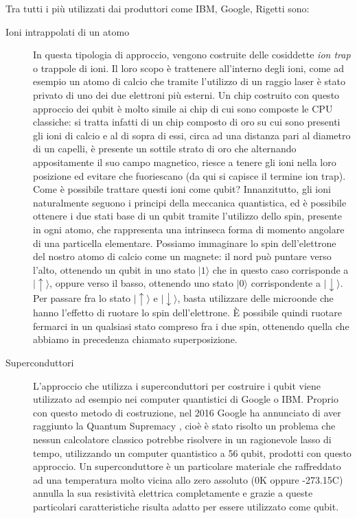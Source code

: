 Tra tutti i più utilizzati dai produttori come IBM, Google, Rigetti sono:

\begin{description}
  \item[Ioni intrappolati di un atomo] In questa tipologia di approccio, vengono costruite delle cosiddette \textit{ion trap} o trappole di ioni. Il loro scopo è trattenere all'interno degli ioni, come ad esempio un atomo di calcio che tramite l'utilizzo di un raggio laser è stato privato di uno dei due elettroni più esterni. Un chip costruito con questo approccio dei qubit è molto simile ai chip di cui sono composte le CPU classiche: si tratta infatti di un chip composto di oro su cui sono presenti gli ioni di calcio e al di sopra di essi, circa ad una distanza pari al diametro di un capelli, è presente un sottile strato di oro che alternando appositamente il suo campo magnetico, riesce a tenere gli ioni nella loro posizione ed evitare che fuoriescano (da qui si capisce il termine ion trap). \\
  Come è possibile trattare questi ioni come qubit? Innanzitutto, gli ioni naturalmente seguono i principi della meccanica quantistica, ed è possibile ottenere i due stati base di un qubit tramite l'utilizzo dello spin, presente in ogni atomo, che rappresenta una intrinseca forma di momento angolare di una particella elementare. Possiamo immaginare lo spin dell'elettrone del nostro atomo di calcio come un magnete: il nord può puntare verso l'alto, ottenendo un qubit in uno stato \(|1\rangle\) che in questo caso corrisponde a \(|\uparrow\rangle\), oppure verso il basso, ottenendo uno stato \(|0\rangle\) corrispondente a \(|\downarrow\rangle\). Per passare fra lo stato \(|\uparrow\rangle\) e \(|\downarrow\rangle\), basta utilizzare delle microonde che hanno l'effetto di ruotare lo spin dell'elettrone. È possibile quindi ruotare fermarci in un qualsiasi stato compreso fra i due spin, ottenendo quella che abbiamo in precedenza chiamato superposizione.
  \item[Superconduttori] L'approccio che utilizza i superconduttori per costruire i qubit viene utilizzato ad esempio nei computer quantistici di Google o IBM. Proprio con questo metodo di costruzione, nel 2016 Google ha annunciato di aver raggiunto la Quantum Supremacy \cite{quantum_supremacy}, cioè è stato risolto un problema che nessun calcolatore classico potrebbe risolvere in un ragionevole lasso di tempo, utilizzando un computer quantistico a 56 qubit, prodotti con questo approccio. Un superconduttore è un particolare materiale che raffreddato ad una temperatura molto vicina allo zero assoluto (0K oppure -273.15C) annulla la sua resistività elettrica completamente e grazie a queste particolari caratteristiche risulta adatto per essere utilizzato come qubit.
\end{description}